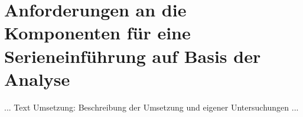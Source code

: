 \chapter{Anforderungen an die Komponenten für eine Serieneinführung auf Basis der Analyse}
\label{cha:Konzeptentwurf}

... Text Umsetzung: Beschreibung der Umsetzung und eigener Untersuchungen ...
